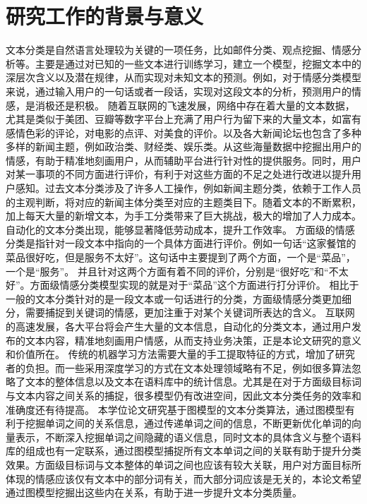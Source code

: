 \thesischapterexordium

\section{研究工作的背景与意义}
文本分类是自然语言处理较为关键的一项任务，比如邮件分类、观点挖掘、情感分析等。主要是通过对已知的一些文本进行训练学习，建立一个模型，挖掘文本中的深层次含义以及潜在规律，从而实现对未知文本的预测。例如，对于情感分类模型来说，通过输入用户的一句话或者一段话，实现对这段文本的分析，预测用户的情感，是消极还是积极。
随着互联网的飞速发展，网络中存在着大量的文本数据，尤其是类似于美团、豆瓣等数字平台上充满了用户行为留下来的大量文本，如富有感情色彩的评论，对电影的点评、对美食的评价。以及各大新闻论坛也包含了多种多样的新闻主题，例如政治类、财经类、娱乐类。从这些海量数据中挖掘出用户的情感，有助于精准地刻画用户，从而辅助平台进行针对性的提供服务。同时，用户对某一事项的不同方面进行评价，有利于对这些方面的不足之处进行改进以提升用户感知。过去文本分类涉及了许多人工操作，例如新闻主题分类，依赖于工作人员的主观判断，将对应的新闻主体分类至对应的主题类目下。随着文本的不断累积，加上每天大量的新增文本，为手工分类带来了巨大挑战，极大的增加了人力成本。自动化的文本分类出现，能够显著降低劳动成本，提升工作效率。
方面级的情感分类是指针对一段文本中指向的一个具体方面进行评价。例如一句话“这家餐馆的菜品很好吃，但是服务不太好”。这句话中主要提到了两个方面，一个是“菜品”，一个是“服务”。
并且针对这两个方面有着不同的评价，分别是“很好吃”和“不太好”。方面级情感分类模型实现的就是对于“菜品”这个方面进行打分评价。
相比于一般的文本分类针对的是一段文本或一句话进行的分类，方面级情感分类更加细分，需要捕捉到关键词的情感，更加注重于对某个关键词所表达的含义。
互联网的高速发展，各大平台将会产生大量的文本信息，自动化的分类文本，通过用户发布的文本内容，精准地刻画用户情感，从而支持业务决策，正是本论文研究的意义和价值所在。
传统的机器学习方法需要大量的手工提取特征的方式，增加了研究者的负担。而一些采用深度学习的方式在文本处理领域略有不足，例如很多算法忽略了文本的整体信息以及文本在语料库中的统计信息。尤其是在对于方面级目标词与文本内容之间关系的捕捉，很多模型仍有改进空间，因此文本分类任务的效率和准确度还有待提高。       
本学位论文研究基于图模型的文本分类算法，通过图模型有利于挖掘单词之间的关系信息，通过传递单词之间的信息，不断更新优化单词的向量表示，不断深入挖掘单词之间隐藏的语义信息，同时文本的具体含义与整个语料库的组成也有一定联系，通过图模型捕捉所有文本单词之间的关联有助于提升分类效果。方面级目标词与文本整体的单词之间也应该有较大关联，用户对方面目标所体现的情感应该仅有文本中的部分词有关，而大部分词应该是无关的，本论文希望通过图模型挖掘出这些内在关系，有助于进一步提升文本分类质量。

